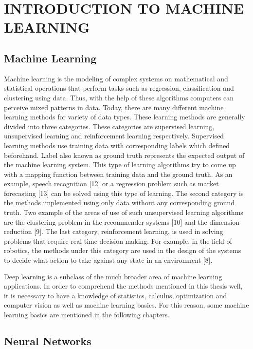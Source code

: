 \chapter{INTRODUCTION TO MACHINE LEARNING }\label{intro_to_ml}

\section{Machine Learning}

Machine learning is the modeling of complex systems on mathematical and statistical operations that perform tasks such as regression, classification and clustering using data. Thus, with the help of these algorithms computers can perceive mixed patterns in data. Today, there are many different machine learning methods for variety of data types. These learning methods are generally divided into three categories. These categories are supervised learning, unsupervised learning and reinforcement learning respectively. Supervised learning methods use training data with corresponding labels which defined beforehand. Label also known as ground truth represents the expected output of the machine learning system. This type of learning algorithms try to come up with a mapping function between training data and the ground truth. As an example, speech recognition [12] or a regression problem such as market forecasting [13] can be solved using this type of learning. The second category is the methods implemented using only data without any corresponding ground truth. Two example of the areas of use of such unsupervised learning algorithms are the clustering problem in the recommender systems [10] and the dimension reduction [9]. The last category, reinforcement learning, is used in solving problems that require real-time decision making. For example, in the field of robotics, the methods under this category are used in the design of the systems to decide what action to take against any state in an environment [8].

Deep learning is a subclass of the much broader area of machine learning applications. In order to comprehend the methods mentioned in this thesis well, it is necessary to have a knowledge of statistics, calculus, optimization and computer vision as well as machine learning basics. For this reason, some machine learning basics are mentioned in the following chapters.


\section{Neural Networks}

